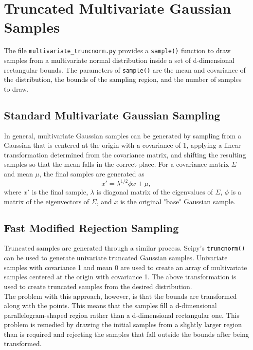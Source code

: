 \documentclass{article}
\begin{document}
\section{Truncated Multivariate Gaussian Samples}

The file \texttt{multivariate\_truncnorm.py} provides a \texttt{sample()}
function to draw samples from a multivariate normal distribution inside a set of
d-dimensional rectangular bounds. The parameters of \texttt{sample()} are the
mean and covariance of the distribution, the bounds of the sampling region, and
the number of samples to draw.

\subsection{Standard Multivariate Gaussian Sampling}

In general, multivariate Gaussian samples can be generated by sampling from a
Gaussian that is centered at the origin with a covariance of 1, applying a
linear transformation determined from the covariance matrix, and shifting the
resulting samples so that the mean falls in the correct place. For a covariance
matrix $\Sigma$ and mean $\mu$, the final samples are generated as
\begin{equation}
    x' = \lambda^{1/2} \phi x + \mu,
\end{equation}
where $x'$ is the final sample, $\lambda$ is diagonal matrix of the eigenvalues
of $\Sigma$, $\phi$ is a matrix of the eigenvectors of $\Sigma$, and $x$ is the
original "base" Gaussian sample. \\

\subsection{Fast Modified Rejection Sampling}

Truncated samples are generated through a similar process. Scipy's
\texttt{truncnorm()} can be used to generate univariate truncated Gaussian
samples. Univariate samples with covariance 1 and mean 0 are used to create an
array of multivariate samples centered at the origin with covariance 1. The
above transformation is used to create truncated samples from the
desired distribution. \\

The problem with this approach, however, is that the bounds are transformed
along with the points. This means that the samples fill a d-dimensional
parallelogram-shaped region rather than a d-dimensional rectangular one. This
problem is remedied by drawing the initial samples from a slightly larger region
than is required and rejecting the samples that fall outside the bounds after
being transformed. \\
\end{document}
